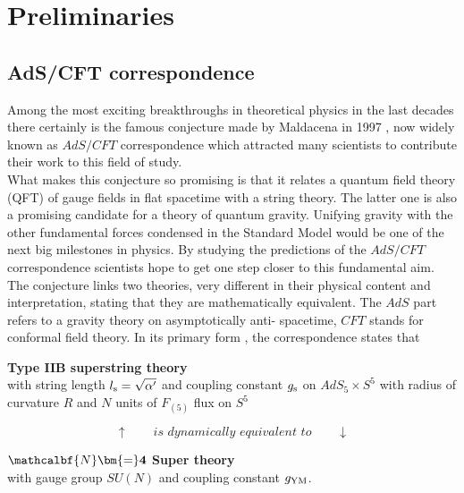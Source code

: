 \chapter{Preliminaries} \label{sec: preleminaries}
\section{AdS/CFT correspondence}
%
%
Among the most exciting breakthroughs in theoretical physics in the last decades there certainly is the famous conjecture made by Maldacena in 1997 \cite{maldacena1}, now widely known as $AdS/CFT$ correspondence which attracted many scientists to contribute their work to this field of study.\\
What makes this conjecture so promising is that it relates a quantum field theory (QFT) of gauge fields in flat spacetime with a string theory. The latter one is also a promising candidate for a theory of quantum gravity. Unifying gravity with the other fundamental forces condensed in the Standard Model would be one of the next big milestones in physics. By studying the predictions of the $AdS/CFT$ correspondence scientists hope to get one step closer to this fundamental aim.
The conjecture links two theories, very different in their physical content and interpretation, stating that they are mathematically equivalent.
The $AdS$ part refers to a gravity theory on asymptotically anti- spacetime,  $CFT$ stands for conformal field theory. In its primary form \cite{Ammon:2015wua}, the correspondence states that \\[0.2cm]
%
%
%
\begin{tcolorbox}[colback=white!95!black, colframe=white!90!black]
\begin{center}
\textbf{Type IIB superstring theory} \\
with string length $l_{\rm s}=\sqrt{\alpha'}$ and coupling constant $g_{\rm s}$ on $AdS_{5}\times S^{5}$ with radius of curvature $R$ and $N$ units of $F_{(5)}$ flux on $S^{5}$
\end{center}
\end{tcolorbox}
%
\begin{equation*}
\uparrow \qquad \textit{is dynamically equivalent to} \qquad \downarrow
\end{equation*}\hspace{1mm}
%
%
\begin{tcolorbox}[colback=white!95!black, colframe=white!90!black]
\begin{center}
\textbf{$\mathcalbf{N}\bm{=}\mathbf{4}$ Super  theory}\\
with gauge group $SU(N)$ and  coupling constant $g_{\rm YM}$.
\end{center}
\end{tcolorbox}
